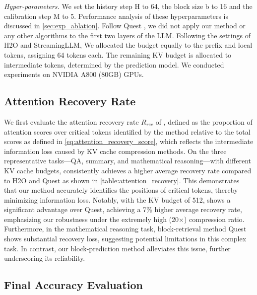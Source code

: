 \textit{Hyper-parameters.}
We set the history step H to 64, the block size b to 16 and the calibration step M to 5. Performance analysis of these hyperparameters is discussed in \autoref{sec:exp_ablation}. 
Follow Quest \citep{tang2024quest}, we did not apply our method or any other algorithms to the first two layers of the LLM. 
Following the settings of H2O and StreamingLLM, 
We allocated the budget equally to the prefix and local tokens, assigning 64 tokens each.
The remaining KV budget is allocated to intermediate tokens, determined by the prediction model.
We conducted experiments on NVIDIA A800 (80GB) GPUs.


\subsection{Attention Recovery Rate}


We first evaluate the attention recovery rate $R_{rec}$ of \ours, defined as the proportion of attention scores over critical tokens identified by the method relative to the total scores as defined in \autoref{eq:attention_recovery_score}, which reflects the intermediate information loss caused by KV cache compression methods. 
On the three representative tasks—QA, summary, and mathematical reasoning—with different KV cache budgets, \ours consistently achieves a higher average recovery rate compared to H2O\citep{zhang2023h2o} and Quest \citep{tang2024quest} as shown in \autoref{table:attention_recovery}.
This demonstrates that our method accurately identifies the positions of critical tokens, thereby minimizing information loss. 
Notably, with the KV budget of 512, \ours shows a significant advantage over Quest, achieving a 7\% higher average recovery rate, emphasizing our robustness under the extremely high (20$\times$) compression ratio. Furthermore, in the mathematical reasoning task, block-retrieval method Quest shows substantial recovery loss, suggesting potential limitations in this complex task. In contrast, our block-prediction method alleviates this issue, further underscoring its reliability.

\subsection{Final Accuracy Evaluation}
\label{sec:exp_main}


